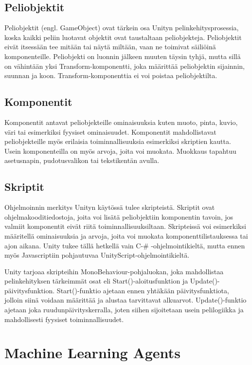 \documentclass[utf8]{gradu3}
\begin{document}
\subsection{Peliobjektit}

Peliobjektit (engl. GameObject) ovat tärkein osa Unityn pelinkehitysprosessia, koska kaikki peliin luotavat objektit ovat taustaltaan peliobjekteja. Peliobjektit eivät itsessään tee mitään tai näytä miltään, vaan ne toimivat säiliöinä komponenteille. Peliobjekti on luonnin jälkeen muuten täysin tyhjä, mutta sillä on vähintään yksi Transform-komponentti, joka määrittää peliobjektin sijainnin, suunnan ja koon. Transform-komponenttia ei voi poistaa peliobjektilta.

\subsection{Komponentit}

Komponentit antavat peliobjekteille ominaisuuksia kuten muoto, pinta, kuvio, väri tai esimerkiksi fyysiset ominaisuudet. Komponentit mahdollistavat peliobjekteille myös erilaisia toiminnallisuuksia esimerkiksi skriptien kautta. Usein komponenteilla on myös arvoja, joita voi muokata. Muokkaus tapahtuu asetusnapin, pudotusvalikon tai tekstikentän avulla.

\subsection{Skriptit}

Ohjelmoinnin merkitys Unityn käytössä tulee skripteistä. Skriptit ovat ohjelmakooditiedostoja, joita voi lisätä peliobjektiin komponentin tavoin, jos valmiit komponentit eivät riitä toiminnallisuuksiltaan. Skripteissä voi esimerkiksi määritellä ominaisuuksia ja arvoja, joita voi muokata komponenttilistauksessa tai ajon aikana. Unity tukee tällä hetkellä vain C-\# -ohjelmointikieltä, mutta ennen myös Javascriptiin pohjautuvaa UnityScript-ohjelmointikieltä.

Unity tarjoaa skripteihin MonoBehaviour-pohjaluokan, joka mahdollistaa pelinkehityksen tärkeimmät osat eli Start()-aloitusfunktion ja Update()-päivitysfunktion. Start()-funktio ajetaan ennen yhtäkään päivitysfunktiota, jolloin siinä voidaan määrittää ja alustaa tarvittavat alkuarvot. Update()-funktio ajetaan joka ruudunpäivityskerralla, joten siihen sijoitetaan usein pelilogiikka ja mahdollisesti fyysiset toiminnallisuudet.

\section{Machine Learning Agents}
\end{document}
